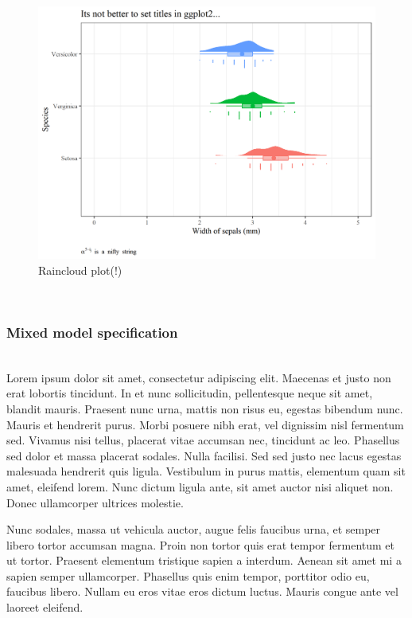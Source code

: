 \documentclass[
]{article}
\begin{document}
\(~\)\\

\begin{figure}[H]

{\centering \includegraphics[width=0.9\linewidth]{cookbook_files/figure-latex/raincloud_call-1} 

}

\caption{Raincloud plot(!)}\label{fig:raincloud_call}
\end{figure}

\(~\)\\

\hypertarget{mixed-model-specification}{%
\subsubsection{Mixed model
specification}\label{mixed-model-specification}}

\(~\)\\

Lorem ipsum dolor sit amet, consectetur adipiscing elit. Maecenas et
justo non erat lobortis tincidunt. In et nunc sollicitudin, pellentesque
neque sit amet, blandit mauris. Praesent nunc urna, mattis non risus eu,
egestas bibendum nunc. Mauris et hendrerit purus. Morbi posuere nibh
erat, vel dignissim nisl fermentum sed. Vivamus nisi tellus, placerat
vitae accumsan nec, tincidunt ac leo. Phasellus sed dolor et massa
placerat sodales. Nulla facilisi. Sed sed justo nec lacus egestas
malesuada hendrerit quis ligula. Vestibulum in purus mattis, elementum
quam sit amet, eleifend lorem. Nunc dictum ligula ante, sit amet auctor
nisi aliquet non. Donec ullamcorper ultrices molestie.

Nunc sodales, massa ut vehicula auctor, augue felis faucibus urna, et
semper libero tortor accumsan magna. Proin non tortor quis erat tempor
fermentum et ut tortor. Praesent elementum tristique sapien a interdum.
Aenean sit amet mi a sapien semper ullamcorper. Phasellus quis enim
tempor, porttitor odio eu, faucibus libero. Nullam eu eros vitae eros
dictum luctus. Mauris congue ante vel laoreet eleifend.
\end{document}
